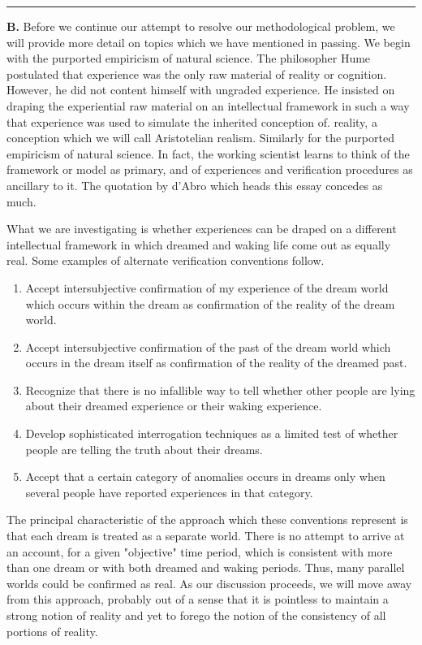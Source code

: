\documentclass[10pt,twoside,draft]{memoir}
\newcommand{\gap}{\plainbreak{2}}
\begin{document}
{{\gap


\textbf{B.} Before we continue our attempt to resolve our methodological 
problem, we will provide more detail on topics which we have mentioned in 
passing. We begin with the purported empiricism of natural science. The 
philosopher Hume postulated that experience was the only raw material of 
reality or cognition. However, he did not content himself with ungraded 
experience. He insisted on draping the experiential raw material on an 
intellectual framework in such a way that experience was used to simulate 
the inherited conception of. reality, a conception which we will call 
Aristotelian realism. Similarly for the purported empiricism of natural 
science. In fact, the working scientist learns to think of the framework or 
model as primary, and of experiences and verification procedures as ancillary 
to it. The quotation by d'Abro which heads this essay concedes as much. 

What we are investigating is whether experiences can be draped on a 
different intellectual framework in which dreamed and waking life come out 
as equally real. Some examples of alternate verification conventions follow. 

\begin{enumerate}
\item Accept intersubjective confirmation of my experience of the dream world 
which occurs within the dream as confirmation of the reality of the dream 
world. 

\item Accept intersubjective confirmation of the past of the dream world which 
occurs in the dream itself as confirmation of the reality of the dreamed past. 

\item Recognize that there is no infallible way to tell whether other people are 
lying about their dreamed experience or their waking experience. 

\item Develop sophisticated interrogation techniques as a limited test of 
whether people are telling the truth about their dreams. 

\item Accept that a certain category of anomalies occurs in dreams only when 
several people have reported experiences in that category. 
\end{enumerate}

The principal characteristic of the approach which these conventions 
represent is that each dream is treated as a separate world. There is no 
attempt to arrive at an account, for a given "objective" time period, which is 
consistent with more than one dream or with both dreamed and waking 
periods. Thus, many parallel worlds could be confirmed as real. As our 
discussion proceeds, we will move away from this approach, probably out of 
a sense that it is pointless to maintain a strong notion of reality and yet to 
forego the notion of the consistency of all portions of reality. 

}}
\end{document}
